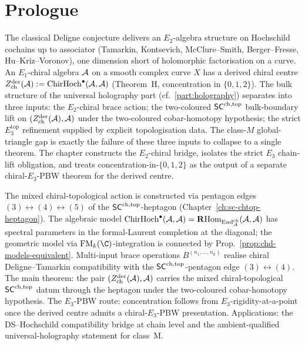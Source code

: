 \section*{Prologue}

The classical Deligne conjecture delivers an $E_2$-algebra structure
on Hochschild cochains up to associator (Tamarkin, Kontsevich,
McClure--Smith, Berger--Fresse, Hu--Kriz--Voronov), one dimension
short of holomorphic factorisation on a curve. An $E_1$-chiral
algebra $\mathcal{A}$ on a smooth complex curve $X$ has a derived chiral
centre
$Z^{\mathrm{der}}_{\mathrm{ch}}(\mathcal{A}) := \mathrm{ChirHoch}^\bullet(\mathcal{A}, \mathcal{A})$
(Theorem~H, concentration in $\{0,1,2\}$). The bulk structure of
the universal holography part (cf.~\ref{part:holography})
separates into three inputs: the $E_2$-chiral brace action; the
two-coloured $\mathsf{SC}^{\mathrm{ch},\mathrm{top}}$ bulk-boundary lift on
$(Z^{\mathrm{der}}_{\mathrm{ch}}(\mathcal{A}),\mathcal{A})$ under the
two-coloured cobar-homotopy hypothesis; the strict
$E_3^{\mathrm{top}}$ refinement supplied by explicit topologisation
data. The class-$M$ global-triangle gap is exactly the failure of
these three inputs to collapse to a single theorem. The chapter
constructs the $E_2$-chiral bridge, isolates the strict $E_3$
chain-lift obligation, and treats concentration-in-$\{0,1,2\}$ as
the output of a separate chiral-$E_3$-PBW theorem for the derived
centre.

The mixed chiral-topological action is constructed via pentagon
edges $(3)\leftrightarrow(4)\leftrightarrow(5)$ of the
$\mathsf{SC}^{\mathrm{ch},\mathrm{top}}$-heptagon (Chapter~\ref{ch:sc-chtop-heptagon}). The
algebraic model $\mathrm{ChirHoch}^\bullet(\mathcal{A},\mathcal{A}) =
\mathbf{R}\mathrm{Hom}_{\mathrm{End}^{\mathrm{ch}}_{\mathcal{A}}}(\mathcal{A},\mathcal{A})$ has spectral parameters
in the formal-Laurent completion at the diagonal; the geometric
model via $\FM_k(\C)$-integration is connected by
Prop.~\ref{prop:chd-models-equivalent}. Multi-input brace
operations $B^{(n_1,\ldots,n_k)}$ realise chiral Deligne--Tamarkin
compatibility with the $\mathsf{SC}^{\mathrm{ch},\mathrm{top}}$-pentagon edge
$(3)\leftrightarrow(4)$. The main theorem: the pair
$(Z^{\mathrm{der}}_{\mathrm{ch}}(\mathcal{A}),\mathcal{A})$ carries the mixed
chiral-topological $\mathsf{SC}^{\mathrm{ch},\mathrm{top}}$ datum through the heptagon under
the two-coloured cobar-homotopy hypothesis. The $E_3$-PBW route:
concentration follows from $E_3$-rigidity-at-a-point once the
derived centre admits a chiral-$E_3$-PBW presentation.
Applications: the DS--Hochschild compatibility bridge at chain
level and the ambient-qualified universal-holography statement
for class~M.

